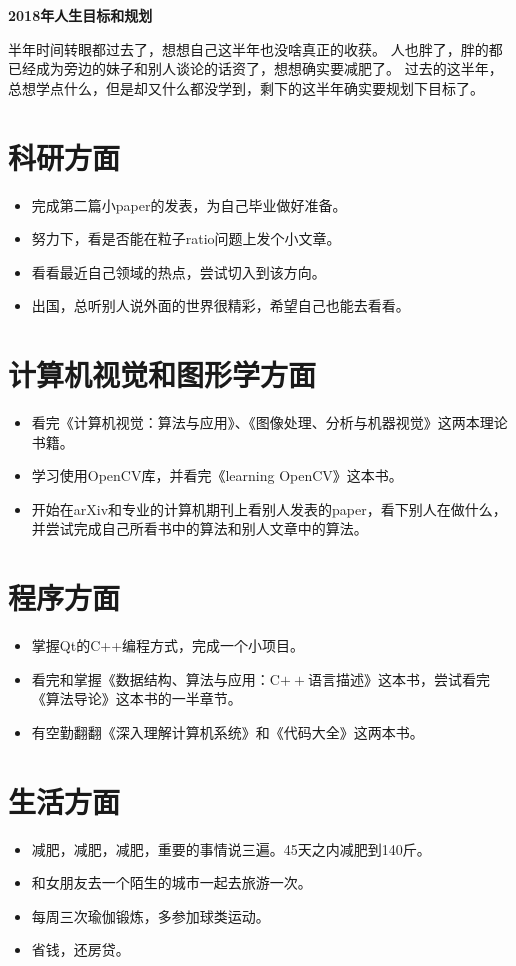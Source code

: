 \documentclass[12pt]{article}
\begin{document}
\begin{center}
  {\huge{\textbf{2018年人生目标和规划}}}
\end{center}
\par
半年时间转眼都过去了，想想自己这半年也没啥真正的收获。%
人也胖了，胖的都已经成为旁边的妹子和别人谈论的话资了，想想确实要减肥了。%
过去的这半年，总想学点什么，但是却又什么都没学到，剩下的这半年确实要规划下目标了。%


\section{科研方面}
\begin{itemize}
\item{完成第二篇小paper的发表，为自己毕业做好准备。}%
\item{努力下，看是否能在粒子ratio问题上发个小文章。}%
\item{看看最近自己领域的热点，尝试切入到该方向。}
\item{出国，总听别人说外面的世界很精彩，希望自己也能去看看。}%
\end{itemize}

\section{计算机视觉和图形学方面}
\begin{itemize}
\item{看完《计算机视觉：算法与应用》、《图像处理、分析与机器视觉》这两本理论书籍。}
\item{学习使用OpenCV库，并看完《learning OpenCV》这本书。}
\item{开始在arXiv和专业的计算机期刊上看别人发表的paper，看下别人在做什么，%
    并尝试完成自己所看书中的算法和别人文章中的算法。}
\end{itemize}

\section{程序方面}
\begin{itemize}
\item{掌握Qt的C++编程方式，完成一个小项目。}
\item{看完和掌握《数据结构、算法与应用：C$++$语言描述》这本书，尝试看完《算法导论》这本书的一半章节。}
\item{有空勤翻翻《深入理解计算机系统》和《代码大全》这两本书。}
\end{itemize}

\section{生活方面}
\begin{itemize}
\item{减肥，减肥，减肥，重要的事情说三遍。45天之内减肥到140斤。}
\item{和女朋友去一个陌生的城市一起去旅游一次。}
\item{每周三次瑜伽锻炼，多参加球类运动。}
\item{省钱，还房贷。}
\end{itemize}
\end{document}
